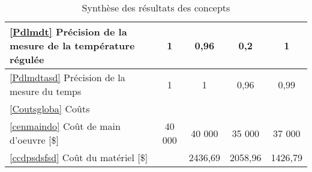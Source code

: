 \begin{table}[]
\begin{tabular}{|p{8cm}|c|c|c|c|}
\ref{Pdlmdt} Précision de la mesure de la température régulée        & 1          & 0,96      & 0,2       & 1         \\ \hline
\ref{Pdlmdtasd} Précision de la mesure du temps & 1 & 1 & 0,96 & 0,99 \\ \hline
\ref{Coutsgloba} Coûts & & & & \\ \hline
\ref{cenmaindo} Coût de main d'oeuvre [\$] & 40 000 & 40 000 & 35 000 & 37 000 \\ \hline
\ref{ccdpsdsfsd} Coût du matériel [\$] & & 2436,69 & 2058,96 & 1426,79 \\ \hline
\end{tabular}
\caption{Synthèse des résultats des concepts}
\label{t:synthese_resultat}
\end{table}






